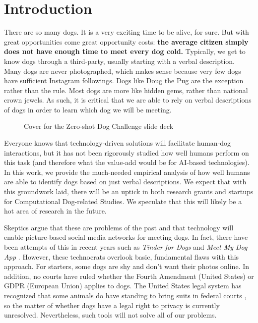 \documentclass[sigplan,10pt]{acmart}
\begin{document}
\section{Introduction}
There are so many dogs. It is a very exciting time to be alive, for sure. But with great opportunities come great opportunity costs: \textbf{the average citizen simply does not have enough time to meet every dog cold.} Typically, we get to know dogs through a third-party, usually starting with a verbal description. Many dogs are never photographed, which makes sense because very few dogs have sufficient Instagram followings. Dogs like Doug the Pug \cite{doug-the-pug} are the exception rather than the rule. Most dogs are more like hidden gems, rather than national crown jewels. As such, it is critical that we are able to rely on verbal descriptions of dogs in order to learn which dog we will be meeting.

\begin{figure}[h!]
    \caption{Cover for the Zero-shot Dog Challenge slide deck}
    \label{fig:cover}
\end{figure}

Everyone knows that technology-driven solutions will facilitate human-dog interactions, but it has not been rigorously studied how well humans perform on this task (and therefore what the value-add would be for AI-based technologies). In this work, we provide the much-needed empirical analysis of how well humans are able to identify dogs based on just verbal descriptions. We expect that with this groundwork laid, there will be an uptick in both research grants and startups for Computational Dog-related Studies. We speculate that this will likely be a hot area of research in the future.

Skeptics argue that these are problems of the past and that technology will enable picture-based social media networks for meeting dogs. In fact, there have been attempts of this in recent years such as \textit{Tinder for Dogs} \cite{tindog} and \textit{Meet My Dog App} \cite{meetmydog}. However, these technocrats overlook basic, fundamental flaws with this approach. For starters, some dogs are shy and don't want their photos online. In addition, no courts have ruled whether the Fourth Amendment (United States) or GDPR (European Union) applies to dogs. The United States legal system has recognized that some animals do have standing to bring suits in federal courts \cite{monkey-standing}, so the matter of whether dogs have a legal right to privacy is currently unresolved. Nevertheless, such tools will not solve all of our problems.
\end{document}
